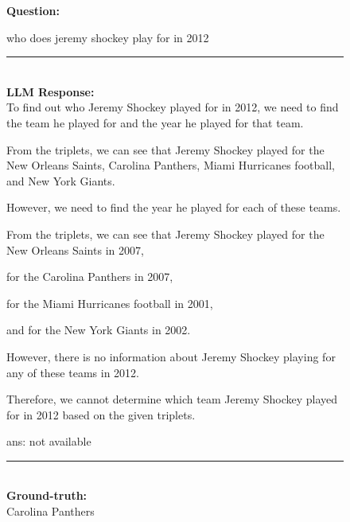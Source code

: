 \begin{figure}
\begin{tcolorbox}[colback=gray!5!white, colframe=gray!75!black, title=WebQSP-WebQTest-612]
\scriptsize

\textbf{Question:}\\
\raggedright who does jeremy shockey play for in 2012

\rule{\linewidth}{0.4pt}
\\
\textbf{LLM Response:}\\
To find out who Jeremy Shockey played for in 2012, we need to find the team he played for and the year he played for that team.



From the triplets, we can see that Jeremy Shockey played for the New Orleans Saints, Carolina Panthers, Miami Hurricanes football, and New York Giants.



However, we need to find the year he played for each of these teams.



From the triplets, we can see that Jeremy Shockey played for the New Orleans Saints in 2007, 

for the Carolina Panthers in 2007, 

for the Miami Hurricanes football in 2001, 

and for the New York Giants in 2002.



However, there is no information about Jeremy Shockey playing for any of these teams in 2012.



Therefore, we cannot determine which team Jeremy Shockey played for in 2012 based on the given triplets.



ans: not available

\rule{\linewidth}{0.4pt}
\\
\textbf{Ground-truth:}\\
Carolina Panthers

\end{tcolorbox}
\end{figure}





